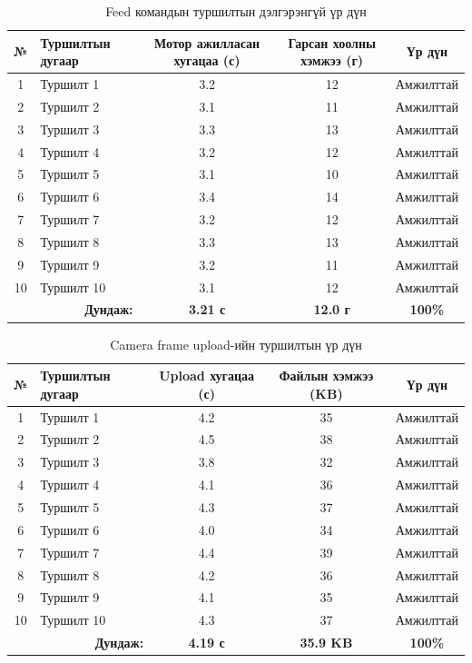 \documentclass[12pt,a4paper]{report}
\begin{document}
\begin{table}[H]
\centering
\scriptsize
\caption{Feed командын туршилтын дэлгэрэнгүй үр дүн}
\label{tab:feed-test-results}
\begin{tabularx}{\textwidth}{|c|X|c|c|c|}
\hline
\textbf{№} & \textbf{Туршилтын дугаар} & \textbf{Мотор ажилласан хугацаа (с)} & \textbf{Гарсан хоолны хэмжээ (г)} & \textbf{Үр дүн} \\ \hline
1  & Туршилт 1  & 3.2 & 12 & Амжилттай \\ \hline
2  & Туршилт 2  & 3.1 & 11 & Амжилттай \\ \hline
3  & Туршилт 3  & 3.3 & 13 & Амжилттай \\ \hline
4  & Туршилт 4  & 3.2 & 12 & Амжилттай \\ \hline
5  & Туршилт 5  & 3.1 & 10 & Амжилттай \\ \hline
6  & Туршилт 6  & 3.4 & 14 & Амжилттай \\ \hline
7  & Туршилт 7  & 3.2 & 12 & Амжилттай \\ \hline
8  & Туршилт 8  & 3.3 & 13 & Амжилттай \\ \hline
9  & Туршилт 9  & 3.2 & 11 & Амжилттай \\ \hline
10 & Туршилт 10 & 3.1 & 12 & Амжилттай \\ \hline
\multicolumn{2}{|r|}{\textbf{Дундаж:}} & \textbf{3.21 с} & \textbf{12.0 г} & \textbf{100\%} \\ \hline
\end{tabularx}
\end{table}



\begin{table}[H]
\centering
\scriptsize
\caption{Camera frame upload-ийн туршилтын үр дүн}
\label{tab:cam-test-results}
\begin{tabularx}{\textwidth}{|c|X|c|c|c|}
\hline
\textbf{№} & \textbf{Туршилтын дугаар} & \textbf{Upload хугацаа (с)} & \textbf{Файлын хэмжээ (KB)} & \textbf{Үр дүн} \\ \hline
1  & Туршилт 1  & 4.2 & 35 & Амжилттай \\ \hline
2  & Туршилт 2  & 4.5 & 38 & Амжилттай \\ \hline
3  & Туршилт 3  & 3.8 & 32 & Амжилттай \\ \hline
4  & Туршилт 4  & 4.1 & 36 & Амжилттай \\ \hline
5  & Туршилт 5  & 4.3 & 37 & Амжилттай \\ \hline
6  & Туршилт 6  & 4.0 & 34 & Амжилттай \\ \hline
7  & Туршилт 7  & 4.4 & 39 & Амжилттай \\ \hline
8  & Туршилт 8  & 4.2 & 36 & Амжилттай \\ \hline
9  & Туршилт 9  & 4.1 & 35 & Амжилттай \\ \hline
10 & Туршилт 10 & 4.3 & 37 & Амжилттай \\ \hline
\multicolumn{2}{|r|}{\textbf{Дундаж:}} & \textbf{4.19 с} & \textbf{35.9 KB} & \textbf{100\%} \\ \hline
\end{tabularx}
\end{table}
\end{document}
